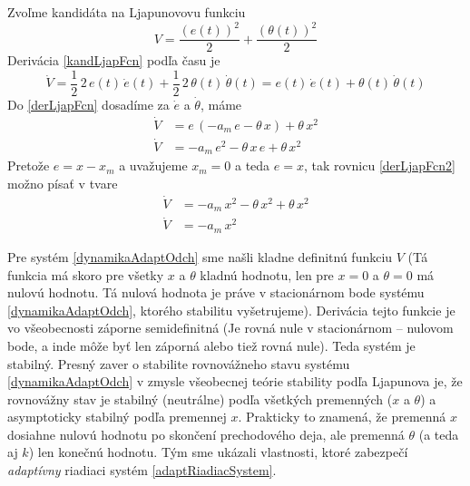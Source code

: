 \documentclass[a4paper, 10pt, ]{article}
\begin{document}
Zvoľme kandidáta na Ljapunovovu funkciu
\begin{equation} \label{kandLjapFcn}
	V = \frac{\left(e(t)\right)^2}{2} + \frac{\left(\theta(t)\right)^2}{2}
\end{equation}
Derivácia \eqref{kandLjapFcn} podľa času je
\begin{equation} \label{derLjapFcn}
	\dot{V} = \frac{1}{2} \, 2 \, e(t) \, \dot{e}(t) + \frac{1}{2} \, 2 \, \theta(t) \, \dot{\theta}(t) =  e(t) \, \dot{e}(t) +  \theta(t) \, \dot{\theta}(t)
\end{equation}
Do \eqref{derLjapFcn} dosadíme za $\dot{e}$ a $\dot{\theta}$, máme
\begin{subequations}
	\begin{align}
	\dot{V} &=   e \, \left( -a_m\,e - \theta \, x \right) +  \theta \, x^2 \\
	\dot{V} &=    -a_m\,e^2 - \theta\, x \, e  +  \theta \, x^2 \label{derLjapFcn2}
	\end{align}
\end{subequations}
Pretože $e = x - x_m$ a uvažujeme $x_m = 0$ a teda $e = x$, tak rovnicu \eqref{derLjapFcn2} možno písať v tvare
\begin{subequations}
	\begin{align}
		\dot{V} &=    -a_m\,x^2 - \theta\, x^2  +  \theta \, x^2 \\
		\dot{V} &=    -a_m\,x^2
	\end{align}
\end{subequations}

Pre systém \eqref{dynamikaAdaptOdch} sme našli kladne definitnú funkciu $V$ (Tá funkcia má skoro pre všetky $x$ a $\theta$ kladnú hodnotu, len pre $x=0$ a $\theta = 0$ má nulovú hodnotu. Tá nulová hodnota je práve v stacionárnom bode systému \eqref{dynamikaAdaptOdch}, ktorého stabilitu vyšetrujeme). Derivácia tejto funkcie je vo všeobecnosti záporne semidefinitná (Je rovná nule v stacionárnom -- nulovom bode, a inde môže byť len záporná alebo tiež rovná nule). Teda systém je stabilný. Presný zaver o stabilite rovnovážneho stavu systému \eqref{dynamikaAdaptOdch} v zmysle všeobecnej teórie stability podľa Ljapunova je, že rovnovážny stav je stabilný (neutrálne) podľa všetkých premenných ($x$ a $\theta$) a asymptoticky stabilný podľa premennej $x$. Prakticky to znamená, že premenná $x$ dosiahne nulovú hodnotu po skončení prechodového deja, ale premenná $\theta$ (a teda aj $k$) len konečnú hodnotu. Tým sme ukázali vlastnosti, ktoré zabezpečí \emph{adaptívny} riadiaci systém \eqref{adaptRiadiacSystem}.
\end{document}
